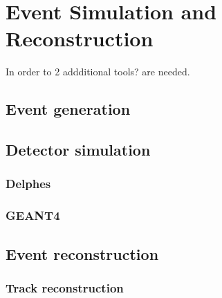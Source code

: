 \graphicspath{{chapt_dutch/}{intro/}{chapt2/}{chapt3/}{chapt4/}{chapt5/}}

\renewcommand\evenpagerightmark{{\scshape\small Chapter 4}}
\renewcommand\oddpageleftmark{{\scshape\small Event Simulation and Reconstruction}}

\hyphenation{}

\chapter{Event Simulation and Reconstruction}
\label{ch4}

In order to 2 addditional tools? are needed.

\section{Event generation}

\section{Detector simulation}

\subsection{Delphes}

\subsection{GEANT4}

\section{Event reconstruction}

\subsection{Track reconstruction}

